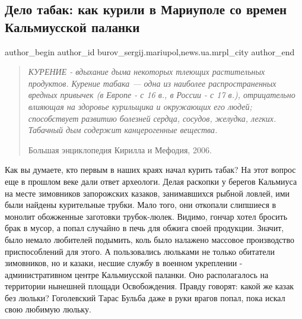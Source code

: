  
 
 
 
 
 
\subsection{Дело табак: как курили в Мариуполе со времен Кальмиусской паланки}
\label{sec:26_01_2019.stz.news.ua.mrpl_city.1.delo_tabak}
 
\ifcmt
 author_begin
   author_id burov_sergij.mariupol,news.ua.mrpl_city
 author_end
\fi

\begin{quote}
\em	
КУРЕНИЕ - вдыхание дыма некоторых тлеющих растительных продуктов. Курение
табака — одна из наиболее распространенных вредных привычек (в Европе - с 16
в., в России - с 17 в.), отрицательно влияющая на здоровье курильщика и
окружающих его людей; способствует развитию болезней сердца, сосудов, желудка,
легких. Табачный дым содержит канцерогенные вещества.

Большая энциклопедия Кирилла и Мефодия, 2006.
\end{quote}

Как вы думаете, кто первым в наших краях начал курить табак? На этот вопрос еще
в прошлом веке дали ответ археологи. Делая раскопки у берегов Кальмиуса на
месте зимовников запорожских казаков, занимавшихся рыбной ловлей, ими были
найдены курительные трубки. Мало того, они откопали слипшиеся в монолит
обожженные заготовки трубок-люлек. Видимо, гончар хотел бросить брак в мусор, а
попал случайно в печь для обжига своей продукции. Значит, было немало любителей
подымить, коль было налажено массовое производство приспособлений для этого. А
пользовались люльками не только обитатели зимовников, но и казаки, несшие
службу в военном укреплении - административном центре Кальмиусской паланки. Оно
располагалось на территории нынешней площади Освобождения. Правду говорят:
какой же казак без люльки? Гоголевский Тарас Бульба даже в руки врагов попал,
пока искал свою любимую люльку.

